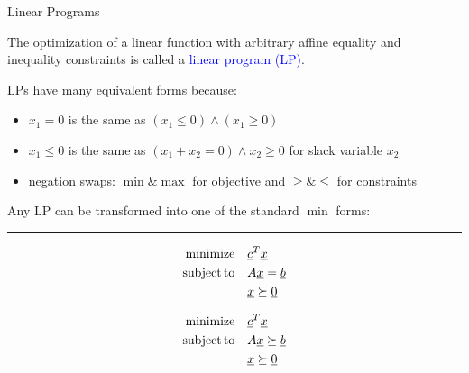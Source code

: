 \documentclass[10pt,letterpaper,english]{beamer}
\begin{document}
\begin{frame}{Linear Programs}

The optimization of a linear function with arbitrary affine equality and \\ inequality constraints is called a \textcolor{blue}{linear program (LP)}.

\vspace{3mm}

LPs have many equivalent forms because:
\begin{itemize}
\item $x_1 \!=\! 0$ is the same as $(x_1 \leq 0) \wedge (x_1\geq 0)$
\item $x_1 \leq 0$ is the same as $(x_1 + x_2 = 0) \wedge x_2 \geq 0$ for slack variable $x_2$
\item negation swaps: $\min \& \max$ for objective and $\geq \& \leq$ for constraints
\end{itemize}  

\begin{definition}
Any LP can be transformed into one of the standard $\min$ forms: \\[1mm]
\hrule \vspace{0mm}
\begin{minipage}{0.49\textwidth}
\vspace{-2mm}
\begin{align*}
\mathrm{minimize} \quad & \underline{c}^T \underline{x} \\
\mathrm{subject\,to} \quad & A \underline{x} = \underline{b} \\
& \underline{x} \succeq \underline{0}
\end{align*}
\end{minipage}
\vrule
\begin{minipage}{0.49\textwidth}
\vspace{-2mm}
\begin{align*}
\mathrm{minimize} \quad & \underline{c}^T \underline{x} \\
\mathrm{subject\,to} \quad & A \underline{x} \succeq \underline{b} \\
& \underline{x} \succeq \underline{0}
\end{align*}
\end{minipage}
\end{definition}

\end{frame}
\end{document}
